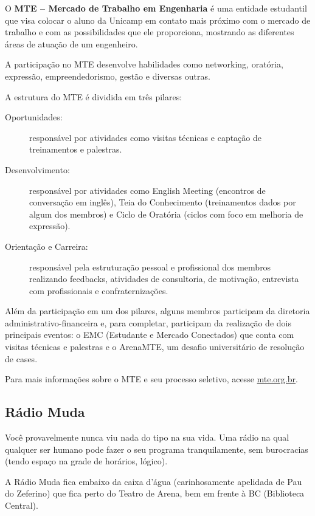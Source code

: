 O \textbf{MTE -- Mercado de Trabalho em Engenharia} é uma entidade estudantil
que visa colocar o aluno da Unicamp em contato mais próximo com o mercado de
trabalho e com as possibilidades que ele proporciona, mostrando as diferentes
áreas de atuação de um engenheiro.

A participação no MTE desenvolve habilidades como networking, oratória,
expressão, empreendedorismo, gestão e diversas outras.

A estrutura do MTE é dividida em três pilares:

\begin{description}
    \item[Oportunidades:] responsável por atividades como visitas técnicas e
        captação de treinamentos e palestras.

    \item[Desenvolvimento:] responsável por atividades como English Meeting
        (encontros de conversação em inglês), Teia do Conhecimento (treinamentos
        dados por algum dos membros) e Ciclo de Oratória (ciclos com foco em
        melhoria de expressão).

    \item[Orientação e Carreira:] responsável pela estruturação pessoal e
        profissional dos membros realizando feedbacks, atividades de
        consultoria, de motivação, entrevista com profissionais e
        confraternizações.
\end{description}

Além da participação em um dos pilares, alguns membros participam da diretoria
administrativo-financeira e, para completar, participam da realização de dois
principais eventos: o EMC (Estudante e Mercado Conectados) que conta com visitas
técnicas e palestras e o ArenaMTE, um desafio universitário de resolução de
cases.

Para mais informações sobre o MTE e seu processo seletivo, acesse
\url{mte.org.br}.

\subsection{Rádio Muda}

Você provavelmente nunca viu nada do tipo na sua vida. Uma rádio na qual
qualquer ser humano pode fazer o seu programa tranquilamente, sem burocracias
(tendo espaço na grade de horários, lógico).

A Rádio Muda fica embaixo da caixa d'água (carinhosamente apelidada de Pau do
Zeferino) que fica perto do Teatro de Arena, bem em frente à BC (Biblioteca
Central).

